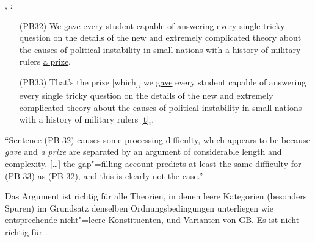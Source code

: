 \documentclass[output=paper]{LSP/langsci}
\begin{document}
\enlargethispage{\baselineskip}
{\randnum}\citet{Pickering1993}, \citet{PickeringBarry1991}:
{
\begin{enumerate}[widest=(PB33)]
\item[(PB32)] We \underline{gave} every student capable of answering every single
  tricky question on the details of the new and extremely complicated
  theory about the causes of political instability in small nations
  with a history of military rulers \underline{a prize}.
\item[(PB33)] That's the prize [which]\textsubscript{\textit{i}} we \underline{gave} every student capable
  of answering every single tricky question on the details of the new
  and extremely complicated theory about the causes of political
  instability in small nations with a history of military rulers \underline{{[t]}$_i$}.
\end{enumerate}
}
{\randnum}"`Sentence (PB 32) causes some processing
difficulty, which appears to be because \textit{gave} and \textit{a prize} are separated
by an argument of considerable length and complexity. [\ldots{}] the
gap"=filling account predicts at least the same difficulty for (PB 33)
as (PB 32), and this is clearly not the case."' \citep[169]{Pickering1993}

{\randnum}Das Argument ist richtig für alle Theorien,
in denen leere Kategorien (besonders Spuren) im Grundsatz denselben
Ordnungsbedingungen unterliegen wie entsprechende nicht"=leere
Konstituenten, \zb {} und Varianten von GB. Es ist nicht richtig
für .
\end{document}
